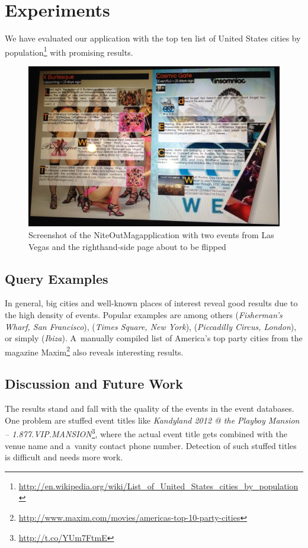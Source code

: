 \documentclass{acm_proc_article-sp}
\let\oldemph\emph
\renewcommand{\emph}[1]{\oldemph{\fontsize{9}{9}\selectfont #1}}
\begin{document}
\section{Experiments}
We have evaluated our application with the top ten list of
United States cities by
population\footnote{\url{http://en.wikipedia.org/wiki/List_of_United_States_cities_by_population}}
with promising results.

\begin{figure}[b!]
\centering
\includegraphics[width=1.0\columnwidth]{./screenshot.jpg}
\caption{Screenshot of the NiteOutMag\texttrademark application with two events from Las Vegas and the righthand-side page about to be flipped}
\label{fig:screenshot}
\end{figure}

\subsection{Query Examples}
In general, big cities and well-known places of interest
reveal good results due to the high density of events.
Popular examples are among others
(\emph{Fisherman's Wharf, San Francisco}),
(\emph{Times Square, New York}),
(\emph{Piccadilly Circus, London}),
or simply (\emph{Ibiza}).	
A~manually compiled list of America's top party cities
from the magazine Maxim\footnote{\url{http://www.maxim.com/movies/americas-top-10-party-cities}}
also reveals interesting results.

\subsection{Discussion and Future Work}
The results stand and fall with the quality of the events
in the event databases.
One problem are stuffed event titles like
\emph{Kandyland 2012 @ the Playboy Mansion -- 1.877.VIP.MANS\-ION}\footnote{\url{http://t.co/YUm7FtmE}},
where the actual event title gets combined with the venue name
and a~vanity contact phone number.
Detection of such stuffed titles is difficult and needs more work.
\end{document}
